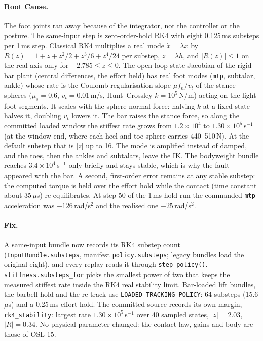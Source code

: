 \documentclass[11pt,a4paper]{article}
\begin{document}
\paragraph{Root Cause.} The foot joints ran away because of the integrator,
not the controller or the posture. The same-input step is zero-order-hold RK4
with eight 0.125\,ms substeps per 1\,ms step. Classical RK4 multiplies a real
mode $\dot x=\lambda x$ by
$R(z)=1+z+z^2/2+z^3/6+z^4/24$ per substep, $z=\lambda h$, and
$|R(z)|\le 1$ on the real axis only for $-2.785\le z\le 0$. The open-loop
state Jacobian of the rigid-bar plant (central differences, the effort held)
has real foot modes (\texttt{mtp}, subtalar, ankle) whose rate is the
Coulomb regularisation slope $\mu f_n/v_t$ of the stance spheres
($\mu_s=0.6$, $v_t=0.01$\,m/s, Hunt--Crossley $k=10^5$\,N/m) acting on the
light foot segments. It scales with the sphere normal force: halving $k$ at a
fixed state halves it, doubling $v_t$ lowers it. The bar raises the stance
force, so along the committed loaded window the stiffest rate grows from
$1.2\times10^4$ to $1.30\times10^5$\,s$^{-1}$ (at the window end, where each
heel and toe sphere carries 440--510\,N). At the default substep that is
$|z|$ up to 16. The mode is amplified instead of damped, and the toes, then
the ankles and subtalars, leave the IK. The bodyweight bundle reaches
$3.4\times10^4$\,s$^{-1}$ only briefly and stays stable, which is why the
fault appeared with the bar. A second, first-order error remains at any
stable substep: the computed torque is held over the effort hold while the
contact (time constant about 35\,$\mu$s) re-equilibrates. At step 50 of the
1\,ms-hold run the commanded \texttt{mtp} acceleration was $-126$\,rad/s$^2$
and the realised one $-25$\,rad/s$^2$.

\paragraph{Fix.} A same-input bundle now records its RK4 substep count
(\texttt{InputBundle.substeps}, manifest \texttt{policy.substeps}; legacy
bundles load the original eight), and every replay reads it through
\texttt{step\_policy()}. \texttt{stiffness.substeps\_for} picks the smallest
power of two that keeps the measured stiffest rate inside the RK4 real
stability limit. Bar-loaded lift bundles, the barbell hold and the re-track
use \texttt{LOADED\_TRACKING\_POLICY}: 64 substeps (15.6\,$\mu$s) and a
0.25\,ms effort hold. The committed source records its own margin,
\texttt{rk4\_stability}: largest rate $1.30\times10^5$\,s$^{-1}$ over 40
sampled states, $|z|=2.03$, $|R|=0.34$. No physical parameter changed: the
contact law, gains and body are those of OSL-15.
\end{document}
